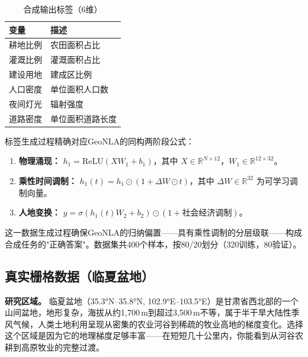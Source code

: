 \documentclass[11pt,a4paper]{article}
\begin{document}
\begin{table}[htbp]
\centering
\caption{合成输出标签（6维）}
\label{tab:synth_output}
\renewcommand{\arraystretch}{1.2}
\begin{tabular}{@{}ll@{}}
\toprule
变量 & 描述 \\
\midrule
耕地比例 & 农田面积占比 \\
灌溉比例 & 灌溉面积占比 \\
建设用地 & 建成区比例 \\
人口密度 & 单位面积人口数 \\
夜间灯光 & 辐射强度 \\
道路密度 & 单位面积道路长度 \\
\bottomrule
\end{tabular}
\end{table}

标签生成过程精确对应GeoNLA的同构两阶段公式：
\begin{enumerate}[nosep,leftmargin=*]
  \item \textbf{物理涌现：} $h_1 = \text{ReLU}(X W_1 + b_1)$，其中 $X \in \mathbb{R}^{N \times 12}$，$W_1 \in \mathbb{R}^{12 \times 32}$。
  \item \textbf{乘性时间调制：} $h_1(t) = h_1 \odot (1 + \Delta W \odot t)$，其中 $\Delta W \in \mathbb{R}^{32}$ 为可学习调制向量。
  \item \textbf{人地变换：} $y = \sigma(h_1(t) W_2 + b_2) \odot (1 + \text{社会经济调制})$。
\end{enumerate}

这一数据生成过程确保GeoNLA的归纳偏置——具有乘性调制的分层级联——构成合成任务的"正确答案"。数据集共400个样本，按80/20划分（320训练，80验证）。

\subsection{真实栅格数据（临夏盆地）}

\textbf{研究区域。} 临夏盆地（35.3°N–35.8°N, 102.9°E–103.5°E）是甘肃省西北部的一个山间盆地，地形复杂，海拔从约1,700\,m到超过3,500\,m不等，属于半干旱大陆性季风气候，人类土地利用呈现从密集的农业河谷到稀疏的牧业高地的梯度变化。选择这个区域是因为它的地理梯度足够丰富——在短短几十公里内，你能看到从河谷农耕到高原牧业的完整过渡。
\end{document}
